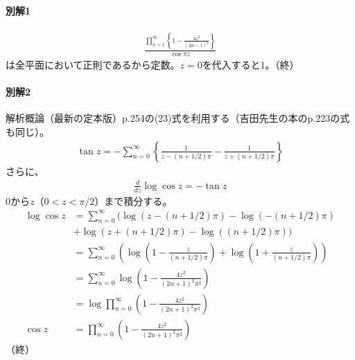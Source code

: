 \paragraph{別解1}
\begin{align*}
    \frac{\prod_{n=1}^{\infty}\left\{1-\frac{4z^2}{(2n-1)^2}\right\}}{\cos\pi z}
\end{align*}
は全平面において正則であるから定数。$z=0$を代入すると1。（終）

\paragraph{別解2}
解析概論（最新の定本版）p.254の(23)式を利用する（吉田先生の本のp.223の式も同じ）。
\begin{align*}
    \tan z=-\sum_{n=0}^{\infty}
    \left\{\frac{1}{z-(n+1/2)\pi}-\frac{1}{z+(n+1/2)\pi}\right\}
\end{align*}
さらに、
\begin{align*}
    \frac{d}{dz}\log\cos z=-\tan z
\end{align*}
0から$z$（$0<z<\pi/2$）まで積分する。
\begin{align*}
    \log\cos z&=\sum_{n=0}^{\infty}(\log(z-(n+1/2)\pi)-\log(-(n+1/2)\pi)\\
    &+\log(z+(n+1/2)\pi)-\log((n+1/2)\pi))\\
    &=\sum_{n=0}^{\infty}(\log(1-\frac{z}{(n+1/2)\pi})+\log(1+\frac{z}{(n+1/2)\pi}))\\
    &=\sum_{n=0}^{\infty}\log(1-\frac{4z^2}{(2n+1)^2\pi^2})\\
    &=\log\prod_{n=0}^{\infty}(1-\frac{4z^2}{(2n+1)^2\pi^2})\\
    \cos z&=\prod_{n=0}^{\infty}(1-\frac{4z^2}{(2n+1)^2\pi^2})
\end{align*}
（終）